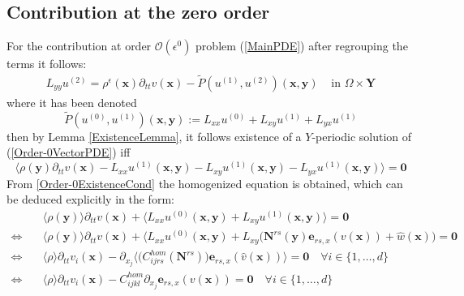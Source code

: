 \subsection{Contribution at the zero order}
For the contribution at order $\mathcal{O}(\epsilon^0)$ problem (\ref{MainPDE}) after regrouping the terms it follows:
\begin{equation}
    \label{Order-0VectorPDE}
    \begin{array}{cc}
        L_{yy} u^{(2)} = \rho^{\epsilon}(\mathbf{x})\partial_{tt} v(\mathbf{x}) - \tilde{P}(u^{(1)},u^{(2)}) (\mathbf{x},\mathbf{y}) & \text{ in } \Omega \times \mathbf{Y}
    \end{array}
\end{equation}
where it has been denoted 
\begin{equation*}
    \tilde{P}(u^{(0)}, u^{(1)}) (\mathbf{x},\mathbf{y}) :=  L_{xx} u^{(0)} + L_{xy} u^{(1)} + L_{yx} u^{(1)}
\end{equation*}
then by Lemma \ref{ExistenceLemma}, it follows existence of a $Y$-periodic solution of (\ref{Order-0VectorPDE}) iff 
\begin{equation}
    \label{Order-0ExistenceCond}
    \big \langle \rho(\mathbf{y}) \partial_{tt} v(\mathbf{x}) - L_{xx} u^{(1)} (\mathbf{x},\mathbf{y}) - L_{xy} u^{(1)}(\mathbf{x},\mathbf{y}) - L_{yx} u^{(1)}(\mathbf{x},\mathbf{y}) \big \rangle = \mathbf{0}
\end{equation}
From \ref{Order-0ExistenceCond} the homogenized equation is obtained, which can be deduced explicitly in the form:
\begin{align*}
    & \quad \langle \rho(\mathbf{y}) \rangle \partial_{tt} v(\mathbf{x}) + \langle L_{xx} u^{(0)}(\mathbf{x},\mathbf{y}) +L_{xy} u^{(1)}(\mathbf{x},\mathbf{y}) \rangle = \mathbf{0} \\
    \Leftrightarrow & \quad \langle \rho(\mathbf{y}) \rangle \partial_{tt} v(\mathbf{x}) + \langle L_{xx} u^{(0)}(\mathbf{x}, \mathbf{y}) + L_{xy}\big( \mathbf{N}^{rs}(\mathbf{y})\mathbf{e}_{rs,x}(v(\mathbf{x})) + \hat{w}(\mathbf{x})\big) = \mathbf{0} \\
    \Leftrightarrow & \quad \langle \rho\rangle \partial_{tt} v_i(\mathbf{x}) - \partial_{x_j}\big \langle \big(C_{ijrs}^{hom}(\mathbf{N}^{rs})\big) \mathbf{e}_{rs,x}(\hat{v}(\mathbf{x})) \big \rangle  = \mathbf{0} \quad \forall i \in \{1,\dots, d\}\\
    \Leftrightarrow & \quad \langle \rho \rangle \partial_{tt} v_i(\mathbf{x}) - C_{ijkl}^{hom} \partial_{x_j} \mathbf{e}_{rs,x} (v(\mathbf{x})) = \mathbf{0} \quad \forall i \in \{1,\dots,d\}
\end{align*}
